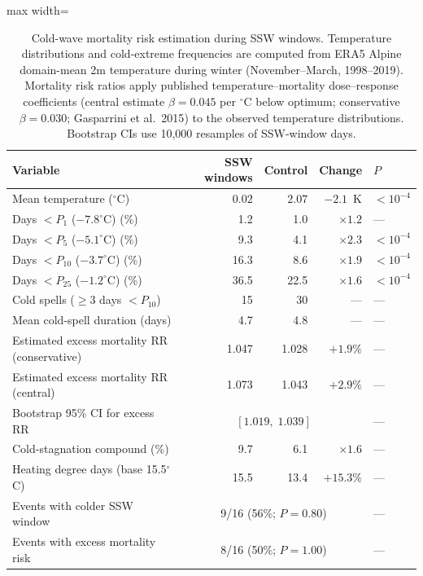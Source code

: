\documentclass[11pt,letterpaper]{article}
\begin{document}
\begin{table}[htbp]
\centering
\caption{Cold-wave mortality risk estimation during SSW windows. Temperature distributions and cold-extreme frequencies are computed from ERA5 Alpine domain-mean 2m temperature during winter (November--March, 1998--2019). Mortality risk ratios apply published temperature--mortality dose--response coefficients (central estimate $\beta = 0.045$ per $^\circ$C below optimum; conservative $\beta = 0.030$; Gasparrini et al.\ 2015\cite{Gasparrini2015}) to the observed temperature distributions. Bootstrap CIs use 10,000 resamples of SSW-window days.}
\label{tab:cold_wave}
\begin{adjustbox}{max width=\textwidth}
\begin{tabular}{lrrrl}
\toprule
\textbf{Variable} & \textbf{SSW windows} & \textbf{Control} & \textbf{Change} & \textbf{$P$} \\
\midrule
Mean temperature ($^\circ$C) & $0.02$ & $2.07$ & $-2.1$~K & $< 10^{-4}$ \\
Days $< P_{1}$ ($-7.8^\circ$C) (\%) & 1.2 & 1.0 & $\times 1.2$ & --- \\
Days $< P_{5}$ ($-5.1^\circ$C) (\%) & 9.3 & 4.1 & $\times 2.3$ & $< 10^{-4}$ \\
Days $< P_{10}$ ($-3.7^\circ$C) (\%) & 16.3 & 8.6 & $\times 1.9$ & $< 10^{-4}$ \\
Days $< P_{25}$ ($-1.2^\circ$C) (\%) & 36.5 & 22.5 & $\times 1.6$ & $< 10^{-4}$ \\
\midrule
Cold spells ($\geq 3$ days $< P_{10}$) & 15 & 30 & --- & --- \\
Mean cold-spell duration (days) & 4.7 & 4.8 & --- & --- \\
\midrule
Estimated excess mortality RR (conservative) & 1.047 & 1.028 & $+1.9\%$ & --- \\
Estimated excess mortality RR (central) & 1.073 & 1.043 & $+2.9\%$ & --- \\
Bootstrap 95\% CI for excess RR & \multicolumn{3}{c}{$[1.019,\; 1.039]$} & --- \\
\midrule
Cold-stagnation compound (\%) & 9.7 & 6.1 & $\times 1.6$ & --- \\
Heating degree days (base 15.5$^\circ$C) & 15.5 & 13.4 & $+15.3\%$ & --- \\
\midrule
Events with colder SSW window & \multicolumn{3}{c}{9/16 (56\%; $P = 0.80$)} & --- \\
Events with excess mortality risk & \multicolumn{3}{c}{8/16 (50\%; $P = 1.00$)} & --- \\
\bottomrule
\end{tabular}
\end{adjustbox}
\end{table}
\end{document}
